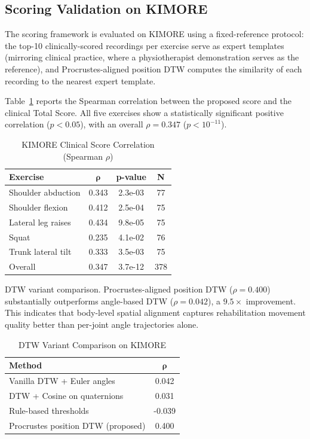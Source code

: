 \subsection{Scoring Validation on KIMORE}
The scoring framework is evaluated on KIMORE using a fixed-reference protocol: the top-10 clinically-scored recordings per exercise serve as expert templates (mirroring clinical practice, where a physiotherapist demonstration serves as the reference), and Procrustes-aligned position DTW computes the similarity of each recording to the nearest expert template.

Table~\ref{tab:kimore_corr} reports the Spearman correlation between the proposed score and the clinical Total Score. All five exercises show a statistically significant positive correlation ($p < 0.05$), with an overall $\rho = 0.347$ ($p < 10^{-11}$).

\begin{table}[htbp]
    \caption{KIMORE Clinical Score Correlation (Spearman $\rho$)}
    \label{tab:kimore_corr}
    \centering
    \begin{tabular}{lccc}
        \toprule
        \textbf{Exercise} & $\boldsymbol{\rho}$ & \textbf{p-value} & \textbf{N} \\
        \midrule
        Shoulder abduction & 0.343 & 2.3e-03 & 77 \\
        Shoulder flexion & 0.412 & 2.5e-04 & 75 \\
        Lateral leg raises & 0.434 & 9.8e-05 & 75 \\
        Squat & 0.235 & 4.1e-02 & 76 \\
        Trunk lateral tilt & 0.333 & 3.5e-03 & 75 \\
        \midrule
        Overall & 0.347 & 3.7e-12 & 378 \\
        \bottomrule
    \end{tabular}
\end{table}


DTW variant comparison. Procrustes-aligned position DTW ($\rho = 0.400$) substantially outperforms angle-based DTW ($\rho = 0.042$), a $9.5\times$ improvement. This indicates that body-level spatial alignment captures rehabilitation movement quality better than per-joint angle trajectories alone.

\begin{table}[htbp]
    \caption{DTW Variant Comparison on KIMORE}
    \label{tab:dtw_ablation}
    \centering
    \begin{tabular}{lc}
        \toprule
        \textbf{Method} & $\boldsymbol{\rho}$ \\
        \midrule
        Vanilla DTW + Euler angles & 0.042 \\
        DTW + Cosine on quaternions & 0.031 \\
        Rule-based thresholds & -0.039 \\
        Procrustes position DTW (proposed) & 0.400 \\
        \bottomrule
    \end{tabular}
\end{table}


